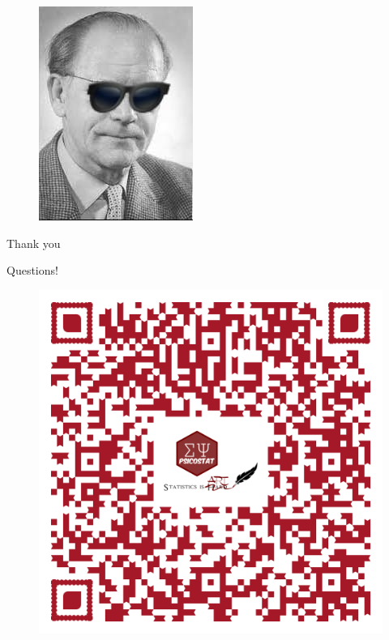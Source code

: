 \documentclass{beamer}
\begin{document}
\begin{frame}[plain]
	\begin{figure}
		\centering
		\includegraphics[width=0.5\linewidth]{raschJ}
	\end{figure}
	
	
	\begin{center}
\Huge

\textcolor{template}{Thank you}
	\end{center}
\end{frame}

\begin{frame}[plain]{Questions!}
\begin{figure}
	\centering
	\includegraphics[width=0.5\linewidth]{domande-simposio-word}
\end{figure}

\end{frame}
\end{document}
